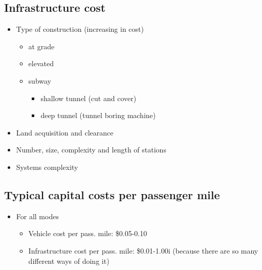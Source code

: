 \documentclass[11pt]{article}
\begin{document}
\subsection{Infrastructure cost}
\label{sec:orge66fbfe}
\begin{itemize}
\item Type of construction (increasing in cost)
\begin{itemize}
\item at grade
\item elevated
\item subway
\begin{itemize}
\item shallow tunnel (cut and cover)
\item deep tunnel (tunnel boring machine)
\end{itemize}
\end{itemize}
\item Land acquisition and clearance
\item Number, size, complexity and length of stations
\item Systems complexity
\end{itemize}

\subsection{Typical capital costs per passenger mile}
\label{sec:orgbe9fd4d}
\begin{itemize}
\item For all modes
\begin{itemize}
\item Vehicle cost per pass. mile: \$0.05-0.10
\item Infrastructure cost per pass. mile: \$0.01-1.00i (because there are so many different ways of doing it)
\end{itemize}
\end{itemize}
\end{document}
